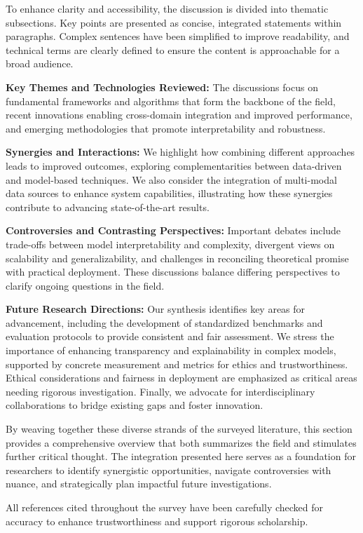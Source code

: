 \documentclass[sigconf]{acmart}
\begin{document}
To enhance clarity and accessibility, the discussion is divided into thematic subsections. Key points are presented as concise, integrated statements within paragraphs. Complex sentences have been simplified to improve readability, and technical terms are clearly defined to ensure the content is approachable for a broad audience.

\textbf{Key Themes and Technologies Reviewed:} The discussions focus on fundamental frameworks and algorithms that form the backbone of the field, recent innovations enabling cross-domain integration and improved performance, and emerging methodologies that promote interpretability and robustness.

\textbf{Synergies and Interactions:} We highlight how combining different approaches leads to improved outcomes, exploring complementarities between data-driven and model-based techniques. We also consider the integration of multi-modal data sources to enhance system capabilities, illustrating how these synergies contribute to advancing state-of-the-art results.

\textbf{Controversies and Contrasting Perspectives:} Important debates include trade-offs between model interpretability and complexity, divergent views on scalability and generalizability, and challenges in reconciling theoretical promise with practical deployment. These discussions balance differing perspectives to clarify ongoing questions in the field.

\textbf{Future Research Directions:} Our synthesis identifies key areas for advancement, including the development of standardized benchmarks and evaluation protocols to provide consistent and fair assessment. We stress the importance of enhancing transparency and explainability in complex models, supported by concrete measurement and metrics for ethics and trustworthiness. Ethical considerations and fairness in deployment are emphasized as critical areas needing rigorous investigation. Finally, we advocate for interdisciplinary collaborations to bridge existing gaps and foster innovation.

By weaving together these diverse strands of the surveyed literature, this section provides a comprehensive overview that both summarizes the field and stimulates further critical thought. The integration presented here serves as a foundation for researchers to identify synergistic opportunities, navigate controversies with nuance, and strategically plan impactful future investigations.

All references cited throughout the survey have been carefully checked for accuracy to enhance trustworthiness and support rigorous scholarship.
\end{document}
